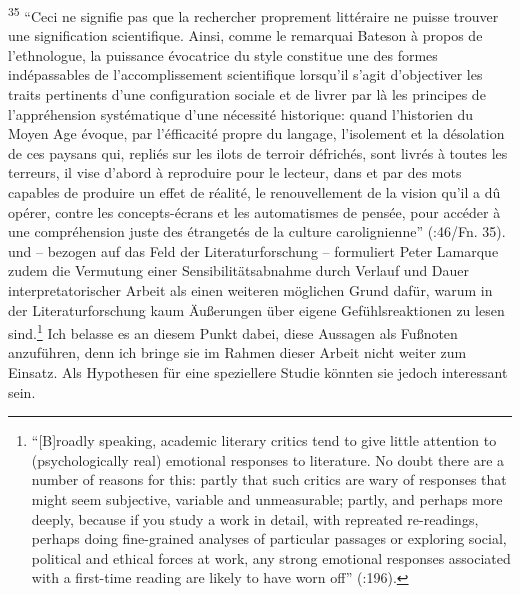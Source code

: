 \documentclass[fontsize=12pt]{scrartcl}
\begin{document}
{\textsuperscript{35} "`Ceci ne signifie pas que la rechercher proprement \flq litt\'{e}raire\frq \,\,ne puisse trouver une signification scientifique. Ainsi, comme le remarquai Bateson \`{a} propos de l'ethnologue, la puissance \'{e}vocatrice du style constitue une des formes ind\'{e}passables de l'accomplissement scientifique lorsqu'il s'agit d'objectiver les traits pertinents d'une configuration sociale et de livrer par l\`{a} les principes de l'appr\'{e}hension syst\'{e}matique d'une n\'{e}cessit\'{e} historique: quand l'historien du Moyen Age \'{e}voque, par l'\'{e}fficacit\'{e} propre du langage, l'isolement et la d\'{e}solation de ces paysans qui, repli\'{e}s sur les ilots de terroir d\'{e}frich\'{e}s, sont livr\'{e}s \`{a} toutes les terreurs, il vise d'abord \`{a} reproduire pour le lecteur, dans et par des mots capables de produire un effet de r\'{e}alit\'{e}, le renouvellement de la vision qu'il a d\^{u} op\'{e}rer, contre les concepts-\'{e}crans et les automatismes de pens\'{e}e, pour acc\'{e}der \`{a} une compr\'{e}hension juste des \'{e}tranget\'{e}s de la culture carolignienne"' (\cite{Bourdieu1984}:46/Fn. 35).} und -- bezogen auf das Feld der Li\-te\-ra\-tur\-for\-schung -- formuliert Peter Lamarque zudem die Vermutung einer Sensibilit\"atsab\-nah\-me durch Verlauf und Dauer interpretatorischer Arbeit als einen weiteren m\"oglichen Grund daf\"ur, warum in der Li\-te\-ra\-tur\-for\-schung kaum \"Au{\ss}erungen \"uber eigene Gef\"uhls\-re\-ak\-tio\-nen zu lesen sind.\footnote{"`[B]roadly speaking, academic literary critics tend to give little attention to (psycholo\-gically real) emotional responses to li\-te\-ra\-ture. No doubt there are a number of reasons for this: partly that such critics are wary of responses that might seem subjective, variable and unmeasurable; partly, and perhaps more deeply, because if you study a work in detail, with repreated re-readings, perhaps doing fine-grained ana\-lyses of particular passages or exploring social, political and ethical forces at work, any strong emotional responses associated with a first-time reading are likely to have worn off"' (\cite{Lamarque2014}:196).} Ich belasse es an diesem Punkt dabei, diese Aussagen als Fu{\ss}noten anzuf\"uhren, denn ich bringe sie im Rahmen dieser Arbeit nicht weiter zum Einsatz. Als Hypothesen f\"ur eine speziellere Studie k\"onnten sie jedoch interessant sein.
\end{document}
